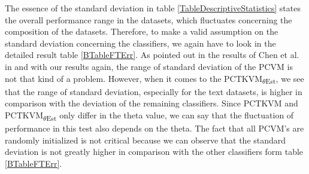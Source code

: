 The essence of the standard deviation in table \ref{TableDescriptiveStatistics} states the overall performance range in the datasets, which fluctuates concerning the composition of the datasets.
Therefore, to make a valid assumption on the standard deviation concerning the classifiers, we again have to look in the detailed result table \ref{BTableFTErr}.
As pointed out in the results of Chen et al. in \cite{Chen.2009} and with our results again, the range of standard deviation of the \acs{PCVM} is not that kind of a problem. 
However, when it comes to the \acs{PCTKVM}\textsubscript{$\theta$Est}, we see that the range of standard deviation, especially for the text datasets, is higher in comparison with the deviation of the remaining classifiers.
Since \acs{PCTKVM} and \acs{PCTKVM}\textsubscript{$\theta$Est} only differ in the theta value, we can say that the fluctuation of performance in this test also depends on the theta.
The fact that all \acs{PCVM}'s are randomly initialized is not critical because we can observe that the standard deviation is not greatly higher in comparison with the other classifiers form table \ref{BTableFTErr}. 
\FloatBarrier

